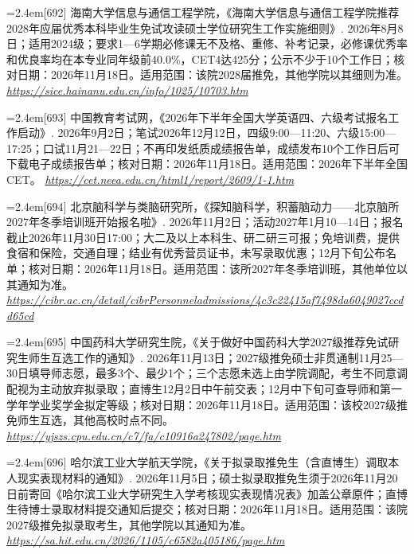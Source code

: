 \par\noindent\hangindent=2.4em\label{src:S0838}{\color{cAccent}[692]} 海南大学信息与通信工程学院，《海南大学信息与通信工程学院推荐2028年应届优秀本科毕业生免试攻读硕士学位研究生工作实施细则》. 2026年8月8日；适用2024级；要求1—6学期必修课无不及格、重修、补考记录，必修课优秀率和优良率均在本专业同年级前40.0\%，CET4达425分；公示不少于10个工作日；核对日期：2026年11月18日。适用范围：该院2028届推免，其他学院以其细则为准。 \textit{\url{https://sice.hainanu.edu.cn/info/1025/10703.htm}}\par
\par\noindent\hangindent=2.4em\label{src:S0839}{\color{cAccent}[693]} 中国教育考试网，《2026年下半年全国大学英语四、六级考试报名工作启动》. 2026年9月2日；笔试2026年12月12日，四级9:00—11:20、六级15:00—17:25；口试11月21—22日；不再印发纸质成绩报告单，成绩发布10个工作日后可下载电子成绩报告单；核对日期：2026年11月18日。适用范围：2026年下半年全国CET。 \textit{\url{https://cet.neea.edu.cn/html1/report/2609/1-1.htm}}\par
\par\noindent\hangindent=2.4em\label{src:S0840}{\color{cAccent}[694]} 北京脑科学与类脑研究所，《探知脑科学，积蓄脑动力——北京脑所2027年冬季培训班开始报名啦》. 2026年11月2日；活动2027年1月10—14日；报名截止2026年11月30日17:00；大二及以上本科生、研二研三可报；免培训费，提供食宿和保险，交通自理；结业有优秀营员证书，未写录取优惠；12月下旬公布名单；核对日期：2026年11月18日。适用范围：该所2027年冬季培训班，其他单位以其通知为准。 \textit{\url{https://cibr.ac.cn/detail/cibrPersonneladmissions/4c3c22415af7498da6049027ccdd65cd}}\par
\par\noindent\hangindent=2.4em\label{src:S0841}{\color{cAccent}[695]} 中国药科大学研究生院，《关于做好中国药科大学2027级推荐免试研究生师生互选工作的通知》. 2026年11月13日；2027级推免硕士非贯通制11月25—30日填导师志愿，最多3个、最少1个；三个志愿未选上由学院调配，考生不同意调配视为主动放弃拟录取；直博生12月2日中午前交表；12月中下旬可查导师和第一学年学业奖学金拟定等级；核对日期：2026年11月18日。适用范围：该校2027级推免师生互选，其他高校时点不同。 \textit{\url{https://yjszs.cpu.edu.cn/c7/fa/c10916a247802/page.htm}}\par
\par\noindent\hangindent=2.4em\label{src:S0842}{\color{cAccent}[696]} 哈尔滨工业大学航天学院，《关于拟录取推免生（含直博生）调取本人现实表现材料的通知》. 2026年11月5日；硕士拟录取推免生须于2026年11月20日前寄回《哈尔滨工业大学研究生入学考核现实表现情况表》加盖公章原件；直博生待博士录取材料提交通知后提交；核对日期：2026年11月18日。适用范围：该院2027级推免拟录取考生，其他学院以其通知为准。 \textit{\url{https://sa.hit.edu.cn/2026/1105/c6582a405186/page.htm}}\par
